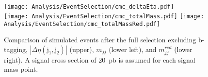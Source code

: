 
\begin{figure}[h!]
\centering
\texttt{[image: Analysis/EventSelection/cmc\_deltaEta.pdf]} \\
\texttt{[image: Analysis/EventSelection/cmc\_totalMass.pdf]}
\texttt{[image: Analysis/EventSelection/cmc\_totalMassRed.pdf]}
\caption{ Comparison of simulated events after the full selection excluding b-tagging, $|\Delta\eta(\mathrm{j}_{1}, \mathrm{j}_{2})|$ (upper), $m_{jj}$ (lower left), and $m_{jj}^{red}$ (lower right). A signal cross section of 20~pb is assumed for each signal mass point.
\label{fig:eventToplogy_prebtag}
}
\end{figure}

